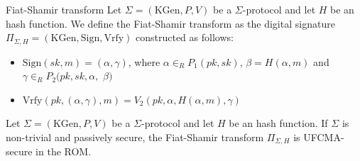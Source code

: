 \documentclass[a4paper, 12pt]{report}
\begin{document}
    \begin{frameddefn}{Fiat-Shamir transform}
        Let $\Sigma = (\mathrm{KGen}, P, V)$ be a $\Sigma$-protocol and let $H$ be an hash function. We define the Fiat-Shamir transform as the digital signature $\Pi_{\Sigma, H} = (\mathrm{KGen}, \mathrm{Sign}, \mathrm{Vrfy})$ constructed as follows:
        \begin{itemize}
            \item $\mathrm{Sign}(sk, m) = (\alpha, \gamma)$, where $\alpha \in_R P_1(pk,sk)$, $\beta = H(\alpha, m)$ and $\gamma \in_R P_2(pk,sk,\alpha,$ $\beta)$
            \item $\mathrm{Vrfy}(pk, (\alpha, \gamma), m) = V_2(pk, \alpha, H(\alpha, m), \gamma)$
        \end{itemize}
    \end{frameddefn}

    \begin{framedthm}{}
        Let $\Sigma = (\mathrm{KGen}, P, V)$ be a $\Sigma$-protocol and let $H$ be an hash function. If $\Sigma$ is non-trivial and passively secure, the Fiat-Shamir transform $\Pi_{\Sigma, H}$ is UFCMA-secure in the ROM.
    \end{framedthm}
\end{document}
